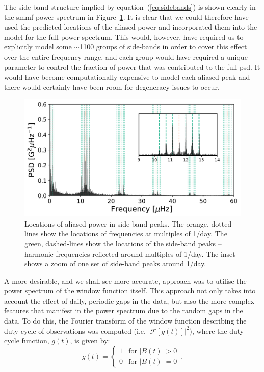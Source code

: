 The side-band structure implied by equation~(\ref{eq:sidebands}) is shown clearly in the \gls{smmf} power spectrum in Figure~\ref{fig:sideband_locations}. It is clear that we could therefore have used the predicted locations of the aliased power and incorporated them into the model for the full power spectrum. This would, however, have required us to explicitly model some $\sim$1100 groups of side-bands in order to cover this effect over the entire frequency range, and each group would have required a unique parameter to control the fraction of power that was contributed to the full \gls{psd}. It would have become computationally expensive to model each aliased peak and there would certainly have been room for degeneracy issues to occur.

\begin{figure}[ht!]
	\centering
	\includegraphics[width=\columnwidth]{sideband.pdf}
	\caption{Locations of aliased power in side-band peaks. The orange, dotted-lines show the locations of frequencies at multiples of 1/day. The green, dashed-lines show the locations of the side-band peaks -- harmonic frequencies reflected around multiples of 1/day.  The inset shows a zoom of one set of side-band peaks around 1/day.}
	\label{fig:sideband_locations}
\end{figure}


A more desirable, and we shall see more accurate, approach was to utilise the power spectrum of the window function itself. This approach not only takes into account the effect of daily, periodic gaps in the data, but also the more complex features that manifest in the power spectrum due to the random gaps in the data. To do this, the Fourier transform of the window function describing the duty cycle of observations was computed (i.e. $\left|\mathcal{F}\left[g(t)\right]\right|^2$), where the duty cycle function, $g(t)$, is given by:
%
\begin{equation}
g(t) = 
\begin{cases} 
1 & \text{for } |B(t)| > 0 \\
0       & \text{for } |B(t)| = 0
\end{cases} \, .
\label{eq:window}
\end{equation}

